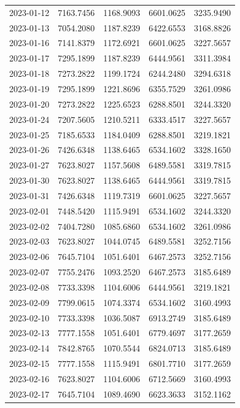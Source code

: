 \begin{footnotesize}
\begin{longtable}{lllll}
2023-01-12 & 7163.7456 & 1168.9093 & 6601.0625 & 3235.9490 \\
2023-01-13 & 7054.2080 & 1187.8239 & 6422.6553 & 3168.8826 \\
2023-01-16 & 7141.8379 & 1172.6921 & 6601.0625 & 3227.5657 \\
2023-01-17 & 7295.1899 & 1187.8239 & 6444.9561 & 3311.3984 \\
2023-01-18 & 7273.2822 & 1199.1724 & 6244.2480 & 3294.6318 \\
2023-01-19 & 7295.1899 & 1221.8696 & 6355.7529 & 3261.0986 \\
2023-01-20 & 7273.2822 & 1225.6523 & 6288.8501 & 3244.3320 \\
2023-01-24 & 7207.5605 & 1210.5211 & 6333.4517 & 3227.5657 \\
2023-01-25 & 7185.6533 & 1184.0409 & 6288.8501 & 3219.1821 \\
2023-01-26 & 7426.6348 & 1138.6465 & 6534.1602 & 3328.1650 \\
2023-01-27 & 7623.8027 & 1157.5608 & 6489.5581 & 3319.7815 \\
2023-01-30 & 7623.8027 & 1138.6465 & 6444.9561 & 3319.7815 \\
2023-01-31 & 7426.6348 & 1119.7319 & 6601.0625 & 3227.5657 \\
2023-02-01 & 7448.5420 & 1115.9491 & 6534.1602 & 3244.3320 \\
2023-02-02 & 7404.7280 & 1085.6860 & 6534.1602 & 3261.0986 \\
2023-02-03 & 7623.8027 & 1044.0745 & 6489.5581 & 3252.7156 \\
2023-02-06 & 7645.7104 & 1051.6401 & 6467.2573 & 3252.7156 \\
2023-02-07 & 7755.2476 & 1093.2520 & 6467.2573 & 3185.6489 \\
2023-02-08 & 7733.3398 & 1104.6006 & 6444.9561 & 3219.1821 \\
2023-02-09 & 7799.0615 & 1074.3374 & 6534.1602 & 3160.4993 \\
2023-02-10 & 7733.3398 & 1036.5087 & 6913.2749 & 3185.6489 \\
2023-02-13 & 7777.1558 & 1051.6401 & 6779.4697 & 3177.2659 \\
2023-02-14 & 7842.8765 & 1070.5544 & 6824.0713 & 3185.6489 \\
2023-02-15 & 7777.1558 & 1115.9491 & 6801.7710 & 3177.2659 \\
2023-02-16 & 7623.8027 & 1104.6006 & 6712.5669 & 3160.4993 \\
2023-02-17 & 7645.7104 & 1089.4690 & 6623.3633 & 3152.1162 \\

\end{longtable}
\end{footnotesize}

